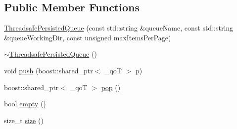 \subsection*{Public Member Functions}
\begin{DoxyCompactItemize}
\item 
\hyperlink{a00045_a97cf702d8b42b4c8fe0b5322dd400778}{Threadsafe\-Persisted\-Queue} (const std\-::string \&queue\-Name, const std\-::string \&queue\-Working\-Dir, const unsigned max\-Items\-Per\-Page)
\item 
\hyperlink{a00045_aa5501a8a59b8c72d9684c4c956cd1de8}{$\sim$\-Threadsafe\-Persisted\-Queue} ()
\item 
void \hyperlink{a00045_ab4be3f974ebbad4fe5ca9c567b0a7de4}{push} (boost\-::shared\-\_\-ptr$<$ \-\_\-qo\-T $>$ p)
\item 
boost\-::shared\-\_\-ptr$<$ \-\_\-qo\-T $>$ \hyperlink{a00045_ac641d52fdd2c291f1ae4799e09ef8933}{pop} ()
\item 
bool \hyperlink{a00045_a5acc045d1b5650aab56b1ea33372f007}{empty} ()
\item 
size\-\_\-t \hyperlink{a00045_ad534f615da86716d4cf8a10d32fe11ce}{size} ()
\end{DoxyCompactItemize}


